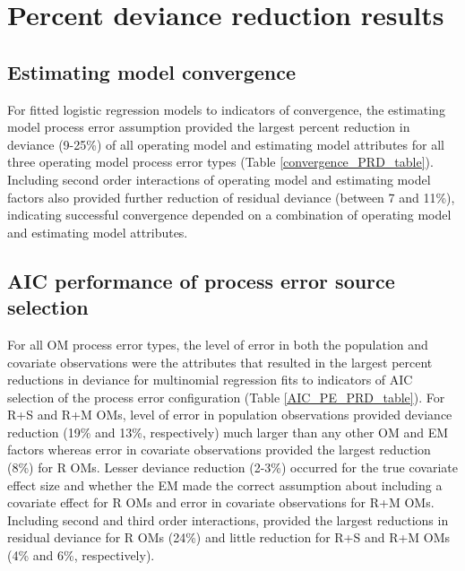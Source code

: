 \documentclass[
  12pt,
]{article}
\begin{document}
\section*{Percent deviance reduction
results}\label{percent-deviance-reduction-results}

\subsection*{Estimating model
convergence}\label{estimating-model-convergence}

For fitted logistic regression models to indicators of convergence, the
estimating model process error assumption provided the largest percent
reduction in deviance (9-25\%) of all operating model and estimating
model attributes for all three operating model process error types
(Table \ref{convergence_PRD_table}). Including second order interactions
of operating model and estimating model factors also provided further
reduction of residual deviance (between 7 and 11\%), indicating
successful convergence depended on a combination of operating model and
estimating model attributes.

\subsection*{AIC performance of process error source
selection}\label{aic-performance-of-process-error-source-selection}

For all OM process error types, the level of error in both the
population and covariate observations were the attributes that resulted
in the largest percent reductions in deviance for multinomial regression
fits to indicators of AIC selection of the process error configuration
(Table \ref{AIC_PE_PRD_table}). For R+S and R+M OMs, level of error in
population observations provided deviance reduction (19\% and 13\%,
respectively) much larger than any other OM and EM factors whereas error
in covariate observations provided the largest reduction (8\%) for R
OMs. Lesser deviance reduction (2-3\%) occurred for the true covariate
effect size and whether the EM made the correct assumption about
including a covariate effect for R OMs and error in covariate
observations for R+M OMs. Including second and third order interactions,
provided the largest reductions in residual deviance for R OMs (24\%)
and little reduction for R+S and R+M OMs (4\% and 6\%, respectively).
\end{document}
